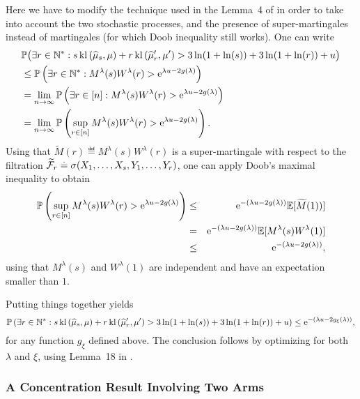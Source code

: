Here we have to modify the technique used in the Lemma~4 of \cite{KK18Martingales} in order to take into account the two stochastic processes, and the presence of super-martingales instead of martingales (for which Doob inequality still works).
One can write
%
\begin{align*}
    &\mathbb{P}\bigl( \exists r \in \mathbb{N}^* : s \, \mathrm{kl}\left(\widehat{\mu}_{s},\mu\right) + r \, \mathrm{kl}\left(\widehat{\mu}_r',\mu'\right) > 3\ln(1+\ln(s)) + 3\ln(1+\ln(r)) + u \bigr) \\
    & \leq \mathbb{P}\left(\exists r \in \mathbb{N}^* : M^\lambda(s)W^\lambda(r) > \mathrm{e}^{\lambda u - 2g(\lambda)}\right) \\
    & = \lim_{n \rightarrow \infty} \mathbb{P}\left(\exists r \in [n] :  M^\lambda(s)W^\lambda(r) > \mathrm{e}^{\lambda u - 2g(\lambda)}\right) \\
    & = \lim_{n \rightarrow \infty} \mathbb{P}\left(\sup_{r \in [n]}  M^\lambda(s)W^\lambda(r) > \mathrm{e}^{\lambda u - 2g(\lambda)}\right).
\end{align*}
%
Using that $\widetilde{M}(r) \eqdef M^\lambda(s)W^\lambda(r)$ is a super-martingale with respect to the filtration $\widetilde{\mathcal{F}}_r \overset{.}{=} \sigma(X_1,\dots,X_s, Y_1,\dots,Y_r)$, one can apply Doob's maximal inequality to obtain
\begin{eqnarray*}
    \mathbb{P}\left(\sup_{r \in [n]}  M^\lambda(s)W^\lambda(r) > \mathrm{e}^{\lambda u - 2g(\lambda)}\right) &\leq& \mathrm{e}^{-(\lambda u - 2g(\lambda))}\mathbb{E}[\widetilde{M}(1))] \\
    & = & \mathrm{e}^{-(\lambda u - 2g(\lambda))}\mathbb{E}[M^\lambda(s)W^\lambda(1)] \\
    & \leq & \mathrm{e}^{-(\lambda u - 2g(\lambda))},
\end{eqnarray*}
using that $M^\lambda(s)$ and $W^\lambda(1)$ are independent and have an expectation smaller than $1$.

Putting things together yields
\[\mathbb{P}\left(\exists r \in \mathbb{N}^* : s \, \mathrm{kl}\left(\widehat{\mu}_{s},\mu\right) + r \, \mathrm{kl}\left(\widehat{\mu}_r',\mu'\right) > 3\ln(1+\ln(s)) + 3\ln(1+\ln(r)) + u\right) \leq \mathrm{e}^{-\left(\lambda u - 2g_{\xi}(\lambda)\right)},\]
for any function $g_{\xi}$ defined above.
%
The conclusion follows by optimizing for both $\lambda$ and $\xi$, using Lemma~18 in \cite{KK18Martingales}.


\subsubsection{A Concentration Result Involving Two Arms}\label{proof:6:Chernoff2arms}

